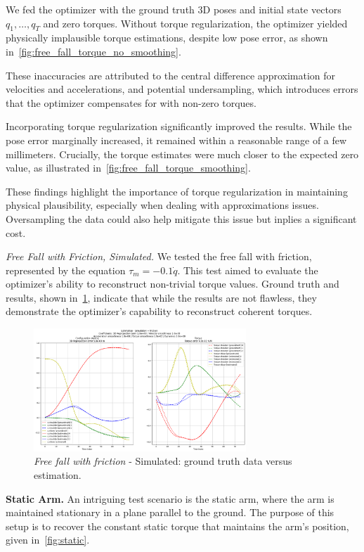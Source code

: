 We fed the optimizer with the ground truth 3D poses and initial state vectors \(q_1, \ldots, q_T\) and zero torques. Without torque 
regularization, the optimizer yielded physically implausible torque estimations, despite low pose error, as shown in~\cref{fig:free_fall_torque_no_smoothing}.


These inaccuracies are attributed to the central difference approximation for velocities and accelerations, and potential undersampling, which 
introduces errors that the optimizer compensates for with non-zero torques.

Incorporating torque regularization significantly improved the results. While the pose error marginally increased, it remained within a 
reasonable range of a few millimeters. Crucially, the torque estimates were much closer to the expected zero value, as illustrated 
in~\cref{fig:free_fall_torque_smoothing}.


These findings highlight the importance of torque regularization in maintaining physical plausibility, especially when dealing with 
approximations issues. Oversampling the data could also help mitigate this issue but inplies a significant cost.

\noindent\textit{Free Fall with Friction, Simulated.} We tested the free fall with friction, represented by the equation 
\(\tau_m = -0.1\dot{q}\). This test aimed to evaluate the optimizer's ability to reconstruct non-trivial torque values. Ground truth and results, 
shown in~\cref{fig:free_fall_friction}, indicate that while the results are not flawless, 
they demonstrate the optimizer's capability to reconstruct coherent torques.

\begin{figure}
    \centering
    \includegraphics[width=8cm]{figures/inverse_dynamics_friction_case_medium_smoothing.png}
    \caption{\textit{Free fall with friction} - Simulated: ground truth data versus estimation.}
    \label{fig:free_fall_friction}
\end{figure}


\noindent\textbf{Static Arm.} An intriguing test scenario is the static arm, where the arm is 
maintained stationary in a plane parallel to the ground. The purpose of this setup is to recover 
the constant static torque that maintains the arm's position, given in~\cref{fig:static}.

